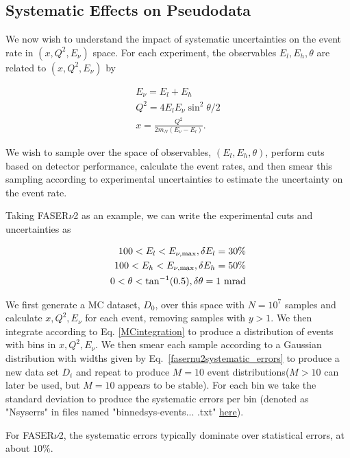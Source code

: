\subsection{Systematic Effects on Pseudodata}
We now wish to understand the impact of systematic uncertainties on the event rate in $(x,Q^2,E_{\nu})$ space. For each experiment, the observables $E_{l},E_{h},\theta$ are related to $(x,Q^2,E_{\nu})$ by 

\begin{align}
E_{\nu} = E_l + E_h \nonumber \\
Q^2 = 4E_lE_{\nu}\sin^2{\theta/2} \nonumber \\
x = \frac{Q^2}{2m_N(E_{\nu} - E_l)}.
\end{align}

We wish to sample over the space of observables, $(E_{l},E_{h},\theta)$, perform  cuts based on detector performance, calculate the event rates, and then smear this sampling according to experimental uncertainties to estimate the uncertainty on the event rate. 

Taking FASER${\nu}$2 as an example, we can write the experimental cuts and uncertainties as 

\begin{align}
100 < E_l < E_{\nu,{\rm max}} , \delta E_l = 30\% \nonumber \\
100 < E_h < E_{\nu,{\rm max}} , \delta E_h = 50\% \nonumber \\
0 < \theta < \tan^{-1}(0.5) , \delta\theta = 1~{\rm mrad}
\label{fasernu2systematic_errors}
\end{align}

We first generate a MC dataset, $D_0$, over this space with $N = 10^7$ samples and calculate $x,Q^2,E_{\nu}$ for each event, removing samples with $y > 1$. We then integrate according to Eq. \ref{MCintegration} to produce a distribution of events with bins in $x,Q^2,E_{\nu}$. We then smear each sample according to a Gaussian distribution with widths given by Eq.~\ref{fasernu2systematic_errors} to produce a new data set $D_i$ and repeat to produce $M = 10$ event distributions($M>10$ can later be used, but $M = 10$ appears to be stable). For each bin we take the standard deviation to produce the systematic errors per bin (denoted as "N\textunderscore sys\textunderscore errs" in files named "binned\textunderscore sys-events... .txt" \href{https://github.com/juanrojochacon/FPF-WG1/tree/main/results}{here}). 

For FASER${\nu}$2, the systematic errors typically dominate over statistical errors, at about $10\%$. 


